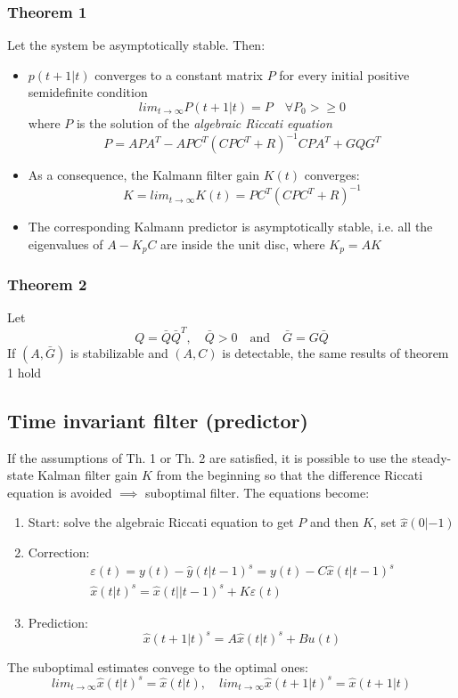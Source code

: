 \documentclass{book}
\begin{document}
\subsubsection{Theorem 1}
Let the system be asymptotically stable. Then: 
\begin{itemize}
    \item $p(t+1|t)$ converges to a constant matrix $P$ for every initial positive semidefinite condition 
        \[
            lim_{t\to\infty}P(t+1|t)=P \quad \forall P_0>\geq0
        \]
        where $P$ is the solution of the \emph{algebraic Riccati equation} 
        \[
            P=APA^T-APC^T(CPC^T+R)^{-1}CPA^T+GQG^T
        \]
    \item As a consequence, the Kalmann filter gain $K(t)$ converges: 
        \[
            K=lim_{t\to\infty}K(t)=PC^T(CPC^T+R)^{-1}
        \]
    \item The corresponding Kalmann predictor is asymptotically stable, i.e. all the eigenvalues of $A-K_pC$ are inside the unit disc, where $K_p=AK$
\end{itemize}
\subsubsection{Theorem 2}
Let 
\[
    Q=\bar{Q}\bar{Q}^T, \quad \bar{Q}>0 \quad \text{and} \quad \bar{G}=G\bar{Q}
\]
If $(A,\bar{G})$ is stabilizable and $(A,C)$ is detectable, the same results of theorem 1 hold

\subsection{Time invariant filter (predictor)}
If the assumptions of Th. 1 or Th. 2 are satisfied, it is possible to use the steady-state Kalman filter gain $K$ from the beginning so that the difference Riccati equation is avoided $\implies$ suboptimal filter. The equations become: 
\begin{enumerate}
    \item Start: solve the algebraic Riccati equation to get $P$ and then $K$, set $\hat{x}(0|-1)$
        \item Correction: \begin{gather}
                \varepsilon(t)=y(t)-\hat{y}(t|t-1)^s=y(t)-C\hat{x}(t|t-1)^s\\
                \hat{x}(t|t)^s=\hat{x}(t||t-1)^s+K\varepsilon(t)
        \end{gather}
        \item Prediction: 
            \[
                \hat{x}(t+1|t)^s=A\hat{x}(t|t)^s+Bu(t)
            \]
\end{enumerate}
The suboptimal estimates convege to the optimal ones: 
\[
    lim_{t\to\infty}\hat{x}(t|t)^s=\hat{x}(t|t), \quad lim_{t\to\infty}\hat{x}(t+1|t)^s=\hat{x}(t+1|t)
\]
\end{document}
